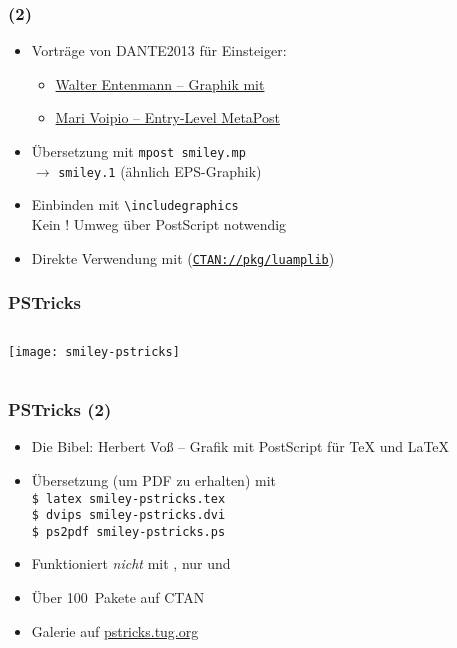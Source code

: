 \begin{frame}
  \frametitle{ (2)}
  \begin{itemize}
  \item Vorträge von DANTE2013 für Einsteiger:
    \begin{itemize}
    \item
      \href{http://www.dante.de/events/dante2013/Programm/Vortraege/folien-entenmann.pdf}{Walter
      Entenmann – Graphik mit }
    \item
      \href{http://www.dante.de/events/dante2013/Programm/Vortraege/folien-voipio.pdf}{Mari
      Voipio – Entry-Level MetaPost}
    \end{itemize}
    \item Übersetzung mit \texttt{mpost smiley.mp}\\
    $\rightarrow$ \texttt{smiley.1} (ähnlich EPS-Graphik)
  \item Einbinden mit \texttt{\textbackslash includegraphics}\\
    Kein !  Umweg über PostScript notwendig
  \item Direkte Verwendung mit  (\texttt{\href{http://ctan.org/pkg/luamplib}{CTAN://pkg/luamplib}})
  \end{itemize}
\end{frame}

\begin{frame}
  \frametitle{PSTricks}
  \begin{columns}[T]
    \begin{column}{.25\textwidth}
      \texttt{[image: smiley-pstricks]}
    \end{column}
    \begin{column}{.75\textwidth}
      TeX}]{examples/graphics/smiley-pstricks.tex}
    \end{column}
  \end{columns}
\end{frame}

\begin{frame}
  \frametitle{PSTricks (2)}
  \begin{itemize}
  \item Die Bibel: Herbert Voß – Grafik mit PostScript für \TeX{} und
    \LaTeX{}
  \item Übersetzung (um PDF zu erhalten) mit\\
    \texttt{\$ latex smiley-pstricks.tex}\\
    \texttt{\$ dvips smiley-pstricks.dvi}\\
    \texttt{\$ ps2pdf smiley-pstricks.ps}
  \item Funktioniert \emph{nicht} mit , nur
     und 
  \item Über 100~Pakete auf CTAN
  \item Galerie auf \href{http://pstricks.tug.org}{pstricks.tug.org}
  \end{itemize}
\end{frame}


